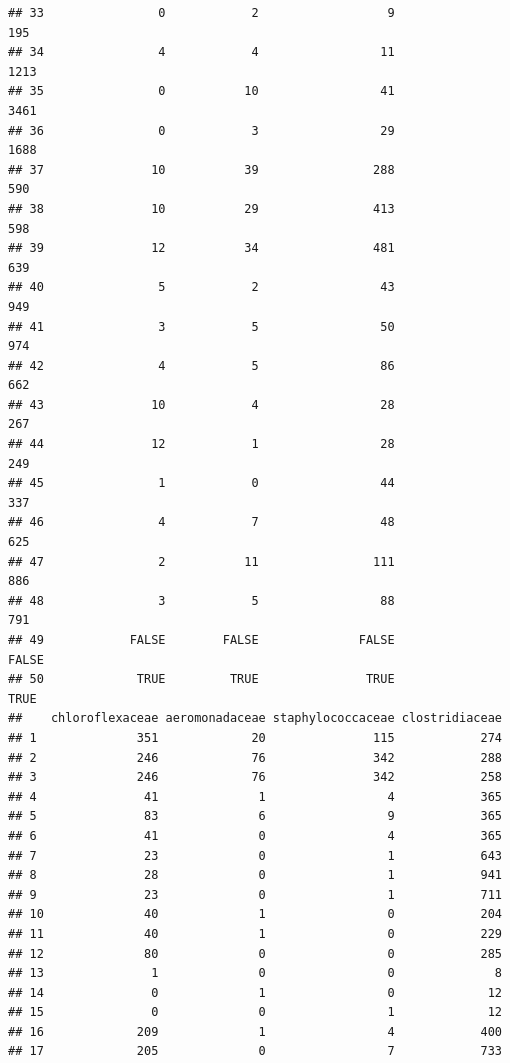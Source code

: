 \documentclass[10pt,handout,english]{beamer}\usepackage[]{graphicx}\usepackage[]{color}
\makeatletter
\newenvironment{kframe}{%
 \def\at@end@of@kframe{}%
 \ifinner\ifhmode%
  \def\at@end@of@kframe{\end{minipage}}%
  \begin{minipage}{\columnwidth}%
 \fi\fi%
 \def\FrameCommand##1{\hskip\@totalleftmargin \hskip-\fboxsep
 \colorbox{shadecolor}{##1}\hskip-\fboxsep
     \hskip-\linewidth \hskip-\@totalleftmargin \hskip\columnwidth}%
 \MakeFramed {\advance\hsize-\width
   \@totalleftmargin\z@ \linewidth\hsize
   \@setminipage}}%
 {\par\unskip\endMakeFramed%
 \at@end@of@kframe}
\newenvironment{knitrout}{}{} %
\makeatother
\begin{document}
\begin{frame}[fragile]
\begin{knitrout}
\begin{kframe}
\begin{verbatim}
## 33                0            2                  9                 195
## 34                4            4                 11                1213
## 35                0           10                 41                3461
## 36                0            3                 29                1688
## 37               10           39                288                 590
## 38               10           29                413                 598
## 39               12           34                481                 639
## 40                5            2                 43                 949
## 41                3            5                 50                 974
## 42                4            5                 86                 662
## 43               10            4                 28                 267
## 44               12            1                 28                 249
## 45                1            0                 44                 337
## 46                4            7                 48                 625
## 47                2           11                111                 886
## 48                3            5                 88                 791
## 49            FALSE        FALSE              FALSE               FALSE
## 50             TRUE         TRUE               TRUE                TRUE
##    chloroflexaceae aeromonadaceae staphylococcaceae clostridiaceae
## 1              351             20               115            274
## 2              246             76               342            288
## 3              246             76               342            258
## 4               41              1                 4            365
## 5               83              6                 9            365
## 6               41              0                 4            365
## 7               23              0                 1            643
## 8               28              0                 1            941
## 9               23              0                 1            711
## 10              40              1                 0            204
## 11              40              1                 0            229
## 12              80              0                 0            285
## 13               1              0                 0              8
## 14               0              1                 0             12
## 15               0              0                 1             12
## 16             209              1                 4            400
## 17             205              0                 7            733

\end{verbatim}
\end{kframe}
\end{knitrout}
\end{frame}
\end{document}
